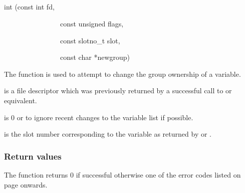 \subsection{\funcnameXBvarchgrp{}}

\begin{expara}

int \funcnameXBvarchgrp{}(const int fd,

\ \ \ \ \ \ \ \ \ \ \ \ \ \ \ \ const unsigned flags,

\ \ \ \ \ \ \ \ \ \ \ \ \ \ \ \ const slotno\_t slot,

\ \ \ \ \ \ \ \ \ \ \ \ \ \ \ \ const char *newgroup)

\end{expara}

The function \funcXBvarchgrp{} is used to attempt to
change the group ownership of a variable.

 is a file descriptor which was previously
returned by a successful call to \funcXBopen{} or equivalent.

 is 0 or
 to ignore recent changes to
the variable list if possible.

 is the slot number corresponding to the
variable as returned by \funcXBvarlist{} or
\funcXBvarfindslot{}.

\subsubsection{Return values}
The function returns 0 if successful otherwise one of the error codes
listed on page \pageref{errorcodes} onwards.

